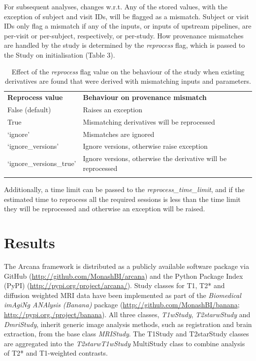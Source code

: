For subsequent analyses, changes w.r.t. Any of the stored values, with
the exception of subject and visit IDs, will be flagged as a mismatch.
Subject or visit IDs only flag a mismatch if any of the inputs, or
inputs of upstream pipelines, are per-visit or per-subject,
respectively, or per-study. How provenance mismatches are handled by the
study is determined by the \emph{reprocess} flag, which is passed to the
Study on initialisation (Table 3).


\begin{table}
\caption{Effect of the \emph{reprocess} flag value on the
behaviour of the study when existing derivatives are found that were
derived with mismatching inputs and parameters.}
\label{tbl:reprocess-flag} 
\begin{tabular}{ll}
\hline\noalign{\smallskip}
\textbf{Reprocess value} & \textbf{Behaviour on provenance mismatch} \\
\noalign{\smallskip}\hline\noalign{\smallskip}
False (default) & Raises an exception \\
True & Mismatching derivatives will be reprocessed \\
`ignore' & Mismatches are ignored \\
`ignore\_versions' & Ignore versions, otherwise raise exception \\
`ignore\_versions\_true' & Ignore versions, otherwise the derivative will be reprocessed \\
\noalign{\smallskip}\hline
\end{tabular}
\end{table}

Additionally, a time limit can be passed to the
\emph{reprocess\_time\_limit}, and if the estimated time to reprocess
all the required sessions is less than the time limit they will be
reprocessed and otherwise an exception will be raised.

\section{Results}
\label{results}

The Arcana framework is distributed as a publicly available software
package via GitHub
(\href{http://github.com/MonashBI/arcana}{{http://github.com/MonashBI/arcana}})
and the Python Package Index (PyPI)
(\href{https://pypi.org/project/arcana/}{{http://pypi.org/project/arcana/}}).
Study classes for T1, T2* and diffusion weighted MRI data have been
implemented as part of the \emph{Biomedical imAgiNg ANAlysis (Banana)}
package
(\href{https://github.com/MonashBI/banana}{{http://github.com/MonashBI/banana}};
\href{http://pypi.org./project/banana}{{http://pypi.org./project/banana}}).
All three classes, \emph{T1wStudy}, \emph{T2starwStudy} and
\emph{DmriStudy}, inherit generic image analysis methods, such as
registration and brain extraction, from the base class \emph{MRIStudy}.
The T1Study and T2starStudy classes are aggregated into the
\emph{T2starwT1wStudy} MultiStudy class to combine analysis of T2* and
T1-weighted contrasts.

